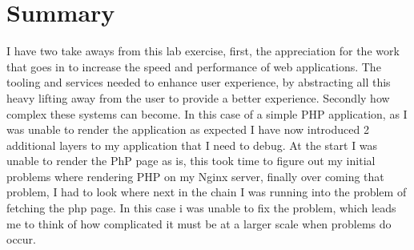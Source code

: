 \section{Summary}
I have two take aways from this lab exercise, first, the appreciation for the work that goes in to increase the speed and performance of web applications. The tooling and services needed to enhance user experience, by abstracting all this heavy lifting away from the user to provide a better experience. Secondly how complex these systems can become. In this case of a simple PHP application, as I was unable to render the application as expected I have now introduced 2 additional layers to my application that I need to debug. At the start I was unable to render the PhP page as is, this took time to figure out my initial problems where rendering PHP on my Nginx server, finally over coming that problem, I had to look where next in the chain I was running into the problem of fetching the php page. In this case i was unable to fix the problem, which leads me to think of how complicated it must be at a larger scale when problems do occur.